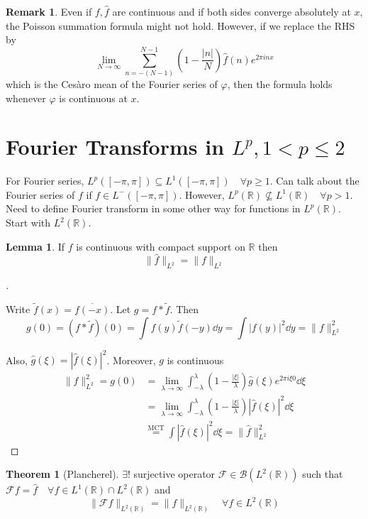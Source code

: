\documentclass{article}
\theoremstyle{definition}
\newtheorem{thm}{Theorem}
\newtheorem{lem}{Lemma}
\newtheorem{rem}{Remark}
\newenvironment{proofs}[1][\proofname]{%
  \begin{proof}[#1]$ $\par\nobreak\ignorespaces
}{%
  \end{proof}
}
\newcommand{\B}{\mathcal B}
\newcommand{\F}{\mathcal F}
\newcommand{\RR}{\mathbb R}
\begin{document}
\begin{rem}
	Even if $f, \widehat{f}$ are continuous and if both sides converge absolutely at $x$, the Poisson summation formula might not hold.
	However, if we replace the RHS by
	\[
		\lim_{N \to \infty} \sum_{n = -(N - 1)}^{N - 1} \left( 1 - \frac{|n|}{N} \right) \widehat{f}(n) e^{2 \pi i n x}
	\]
	which is the Ces\`aro mean of the Fourier series of $\varphi$, then the formula holds whenever $\varphi$ is continuous at $x$.
\end{rem}

\section{Fourier Transforms in \boldmath$L^p, 1 < p \leq 2$\unboldmath}

For Fourier series, $L^p([-\pi, \pi]) \subseteq L^1([-\pi, \pi]) \quad \forall p \geq 1$.
Can talk about the Fourier series of $f$ if $f \in L^-([-\pi, \pi])$.
However, $L^p(\RR) \not\subseteq L^1(\RR) \quad \forall p > 1$.
Need to define Fourier transform in some other way for functions in $L^p(\RR)$.
Start with $L^2(\RR)$.

\begin{lem}
	If $f$ is continuous with compact support on $\RR$ then
	\[
		\|\widehat{f}\|_{L^2} = \|f\|_{L^2}
	\]
\end{lem}

\begin{proofs}
	Write $\tilde{f}(x) = \overline{f(-x)}$.
	Let $g = f * \tilde{f}$.
	Then 
	\[
		g(0) = (f * \tilde{f})(0) = \int f(y) \tilde{f}(-y) \dd{y} = \int |f(y)|^2 \dd{y} = \|f\|_{L^2}^2
	\]

	Also, $\widehat{g}(\xi) = |\widehat{f}(\xi)|^2$.
	Moreover, $g$ is continuous
	\[
		\begin{split}
			\|f\|_{L^2}^2 = g(0) &= \lim_{\lambda \to \infty} \int_{-\lambda}^\lambda \left( 1 - \frac{|\xi|}{\lambda} \right) \widehat{g}(\xi) e^{2 \pi i \xi 0} \dd{\xi}\\
			&= \lim_{\lambda \to \infty} \int_{-\lambda}^\lambda \left(1 - \frac{|\xi|}{\lambda} \right) |\widehat{f}(\xi)|^2 \dd{\xi}\\
			&\stackrel{\text{MCT}} = \int |\widehat{f}(\xi)|^2 \dd{\xi} = \|\widehat{f}\|_{L^2}^2
		\end{split}
	\]
\end{proofs}

\begin{thm}[Plancherel]
	$\exists !$ surjective operator $\F \in \B(L^2(\RR))$ such that $\F f = \hat{f} \quad \forall f \in L^1(\RR) \cap L^2(\RR)$ and 
	\[
		\| \F f\|_{L^2(\RR)} = \|f\|_{L^2(\RR)} \quad \forall f \in L^2(\RR)
	\]
\end{thm}
\end{document}
